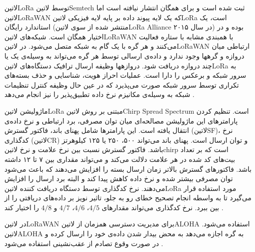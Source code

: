 ‌لاتین{LoRa} توسط ‌لاتین{Semtech} ثبت شده است و برای همگان انتشار نیافته است اما ‌لاتین{LoRaWAN} که یک لایه پیوند داده بر پایه لایه فیزیکی ‌لاتین{LoRa}
است، یک استاندارد رایگان (منتشر شده از سوی ‌لاتین{LoRa Alliance} در سال ۲۰۱۵) بوده و در اختیار همگان است.
شبکه‌های ‌لاتین{LoRaWAN} با همبندی مشابه با ستاره فعالیت می‌کنند و هر گره با یک گام به شبکه متصل می‌شود.
در ‌لاتین{LoRaWAN} ارتباطی میان دروازه و گرهها وجود ندارد و داده‌ی ارسالی توسط هر گره می‌تواند به وسیله‌ی یک یا چند دروازه دریافت شود.
دروازهها وظیفه ارسال ترافیک دستگاه‌های ‌لاتین{LoRa} به سرور شبکه و برعکس را دارا است.
عملیات احراز هویت، شناسایی و حذف بسته‌های تکراری توسط سرور شبکه صورت می‌پذیرد که در عین حال وظیفه کنترل
تنظیمات شبکه به وسیله‌ی مکانیزم نرخ داده تطبیق‌پذیر را نیز انجام می‌دهد .

ماژولیشن ‌لاتین{LoRa} مبتنی بر روش ‌لاتین{Chirp Spread Spectrum} است. تنظیم کردن پارامترهای این ماژولیشن
مصالحه‌ای میان توان مصرفی، برد ارتباطی و نرخ داده‌ی انتقال یافته است.
این پارامترها شامل پهنای باند، فاکتور گسترش (‌لاتین{SF})، نرخ کدگذاری (‌لاتین{CR}) و توان ارسال است.
پهنای باند می‌تواند ۵۰۰، ۲۵۰ یا ۱۲۵ کیلوهرتز باشد.
فاکتور گسترش نسبت بین نرخ علامت و نرخ ‌لاتین{chirp} است که بر تعداد بیت‌های کد شده در هر علامت دلالت می‌کند و می‌تواند مقداری بین ۷ تا ۱۲ داشته باشد.
فاکتورهای گسترش بالاتر زمان ارسال بسته را افزایش می‌دهند که باعث می‌شود توان مصرفی بیشتر شده و نرخ داده کاهش پیدا کند و البته برد ارسال را افزایش می‌دهند.
نرخ کدگذاری توسط دستگاه دریافت کننده ‌لاتین{LoRa} مورد استفاده قرار می‌گیرد تا به واسطه انجام تصحیح خطای رو به جلو، تاثیر نویز بر داده‌های دریافتی را از بین ببرد.
نرخ کدگذاری می‌تواند مقدارهای $4/5$، $4/6$، $4/7$ و $4/8$ را اختیار کند
.

در ‌لاتین{LoRaWAN} برای مدیریت دسترسی همزمان از ‌لاتین{ALOHA} استفاده می‌شود.
‌لاتین{ALOHA} به گره اجازه می‌دهد به محض بیدار شدن داده‌ی خود را ارسال کرده و در صورت وقوع تصادم
از عقب‌نشینی استفاده می‌شود
.


